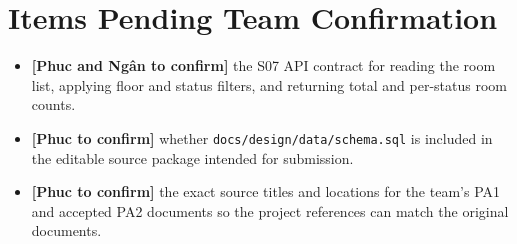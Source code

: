 
\section*{Items Pending Team Confirmation}

\begin{itemize}
  \item \textbf{[Phuc and Ngân to confirm]} the S07 API contract for reading the room list, applying floor and status filters, and returning total and per-status room counts.
  \item \textbf{[Phuc to confirm]} whether \texttt{docs/design/data/schema.sql} is included in the editable source package intended for submission.
  \item \textbf{[Phuc to confirm]} the exact source titles and locations for the team's PA1 and accepted PA2 documents so the project references can match the original documents.
\end{itemize}

\clearpage
